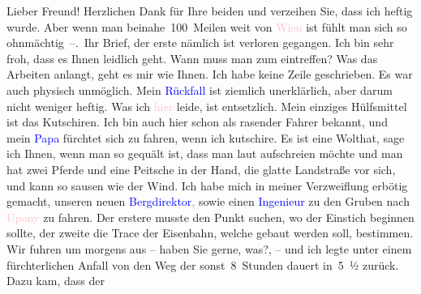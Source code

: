 \pstart
           Lieber Freund! Herzlichen Dank für Ihre beiden \label{K_L03105-1v}\label{K_L03105-1h} und verzeihen Sie, dass ich heftig wurde. Aber wenn man beinahe 100 Meilen
               weit von \textcolor{pink}{Wien}{}\ledrightnote{\textcolor{pink}{Wien}} ist fühlt man sich so
               ohnmächtig –. Ihr Brief, der erste nämlich ist verloren gegangen. Ich bin sehr froh,
               dass es Ihnen leidlich geht. Wann muss man zum \label{K_L03105-2v}\label{K_L03105-2h} eintreffen? Was das Arbeiten anlangt, geht es mir wie Ihnen. Ich habe keine
               Zeile geschrieben. Es war auch physisch unmöglich. Mein \textcolor{blue}{Rückfall}{}\ledrightnote{{$\rightarrow$}\textcolor{blue}{Bertha Karlsburg}} ist ziemlich
               unerklärlich, aber darum nicht weniger heftig. Was ich \textcolor{pink}{hier}{}\ledrightnote{{$\rightarrow$}\textcolor{pink}{Miskolc}} leide, ist entsetzlich. Mein einziges
               Hülfsmittel ist das Kutschiren. Ich bin auch hier schon als rasender Fahrer bekannt,
               und mein \textcolor{blue}{Papa}{}\ledrightnote{{$\rightarrow$}\textcolor{blue}{Philipp Salzmann}} fürchtet sich
               zu fahren, wenn ich kutschire. Es ist eine Wolthat, sage ich Ihnen, wenn man so
               gequält ist, dass man laut aufschreien möchte und man hat zwei Pferde und eine
               Peitsche in der Hand, die glatte Landstraße vor sich, und kann so sausen wie der
               Wind. Ich habe mich in meiner Verzweiflung erbötig gemacht, unseren neuen \textcolor{blue}{Bergdirektor}{}\ledrightnote{{$\rightarrow$}\textcolor{blue}{?? [Bergdirektor]}}\textcolor{gray}{,} sowie einen \textcolor{blue}{Ingenieur}{}\ledrightnote{{$\rightarrow$}\textcolor{blue}{?? [Ingenieur]}} zu den Gruben nach \textcolor{pink}{Upony}{}\ledrightnote{\textcolor{pink}{Uppony}} zu
               fahren. Der erstere musste den Punkt suchen, wo der Einstich beginnen sollte, der
               zweite die Trace der Eisenbahn, welche gebaut werden soll, bestimmen. Wir fuhren um  morgens aus – haben Sie gerne, was?,
               – und ich legte unter einem fürchterlichen Anfall von \label{K_L03105-3v}\label{K_L03105-3h} den Weg der sonst 8 Stunden dauert in 5 ½{ }zurück. Dazu kam, dass der
